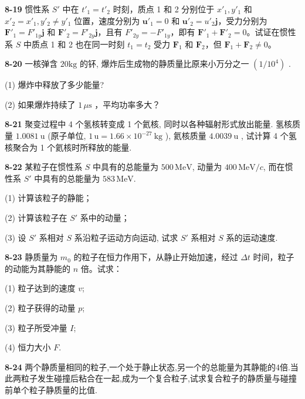 \newpage

\textbf{8-19} 惯性系 $S'$ 中在 $t'_1=t'_2$ 时刻，质点 1 和 2 分别位于 $x'_1,y'_1$ 和 $x'_2=x'_1,y'_2\ne y'_1$ 位置，速度分别为 $\boldsymbol u'_1=0$ 和 $\boldsymbol u'_2=u'_2\boldsymbol j$，受力分别为 $\boldsymbol F'_1=F'_{1y}\boldsymbol j$ 和 $\boldsymbol F'_2=F'_{2y}\boldsymbol j$，且有 $F'_{2y}=-F'_{1y}$，即有 $\boldsymbol F'_1+\boldsymbol F'_2=0$。试证在惯性系 $S$ 中质点 1 和 2 也在同一时刻 $t_1=t_2$ 受力 $\boldsymbol F_1$ 和 $\boldsymbol F_2$，但 $\boldsymbol F_1+\boldsymbol F_2\ne0$。

\newpage

\textbf{8-20} 一核弹含 $20\mathrm{kg}$ 的钚, 爆炸后生成物的静质量比原来小万分之一 $(1 / 10^{4})$ .

(1) 爆炸中释放了多少能量?

(2) 如果爆炸持续了 $1\,\mu\mathrm s$ ，平均功率多大？

\newpage

\textbf{8-21} 聚变过程中 4 个氢核转变成 1 个氦核, 同时以各种辐射形式放出能量. 氢核质量 $1.0081 \mathrm{~u}$ (原子单位, $1\,\mathrm u = 1.66 \times 10^{-27} \mathrm{~kg}$ ), 氦核质量 $4.0039 \mathrm{~u}$ , 试计算 4 个氢核聚合为 1 个氦核时所释放的能量.

\newpage

\textbf{8-22} 某粒子在惯性系 $S$ 中具有的总能量为 $500\,\mathrm{MeV}$, 动量为 $400\,\mathrm{MeV}/c$, 而在惯性系 $S'$ 中具有的总能量为 $583\,\mathrm{MeV}$.

(1) 计算该粒子的静能；

(2) 计算该粒子在 $S'$ 系中的动量；

(3) 设 $S'$ 系相对 $S$ 系沿粒子运动方向运动, 试求 $S'$ 系相对 $S$ 系的运动速度.

\newpage

\textbf{8-23} 静质量为 $m_{0}$ 的粒子在恒力作用下，从静止开始加速，经过 $\Delta t$ 时间，粒子的动能为其静能的 $n$ 倍。试求：

(1) 粒子达到的速度 $v$;

(2) 粒子获得的动量 $p$;

(3) 粒子所受冲量 $I$;

(4) 恒力大小 $F$.

\newpage

\textbf{8-24} 两个静质量相同的粒子,一个处于静止状态,另一个的总能量为其静能的4倍.当此两粒子发生碰撞后粘合在一起,成为一个复合粒子,试求复合粒子的静质量与碰撞前单个粒子静质量的比值.

